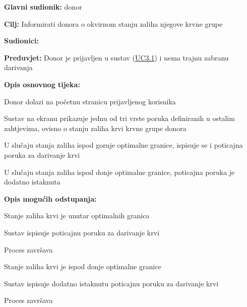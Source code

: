 					
					\noindent {}
					\begin{packed_item}
	
						\item \textbf{Glavni sudionik: }donor
						\item  \textbf{Cilj:} Informirati donora o okvirnom stanju zaliha njegove krvne grupe
						\item  \textbf{Sudionici:} 
						\item  \textbf{Preduvjet:} Donor je prijavljen u sustav (\hyperref[UC3.1]{UC3.1}) i nema trajnu zabranu darivanja
						\item  \textbf{Opis osnovnog tijeka:}
						
						\item[] \begin{packed_enum}
	
							\item Donor dolazi na početnu stranicu prijavljenog korisnika
	                        \item Sustav na ekranu prikazuje jednu od tri vrste poruka definiranih u ostalim zahtjevima, ovisno o stanju zaliha krvi krvne grupe donora
	                        \item U slučaju stanja zaliha ispod gornje optimalne granice, ispisuje se i poticajna poruka za darivanje krvi
	                        \item U slučaju stanja zaliha ispod donje optimalne granice, poticajna poruka je dodatno istaknuta

						\end{packed_enum}
						
						\item  \textbf{Opis mogućih odstupanja:}
						
						\item[] \begin{packed_item}
	
							\item[2] Stanje zaliha krvi je unutar optimalnih granica
							\item[] \begin{packed_enum}
								\item Sustav ispisuje poticajnu poruku za darivanje krvi
								\item Proces završava
							\end{packed_enum}
							
							\item[2] Stanje zaliha krvi je ispod donje optimalne granice
							\item[] \begin{packed_enum}
								\item Sustav ispisuje dodatno istaknutu poticajnu poruku za darivanje krvi
								\item Proces završava
							\end{packed_enum}

						\end{packed_item}
						
					\end{packed_item}
					
